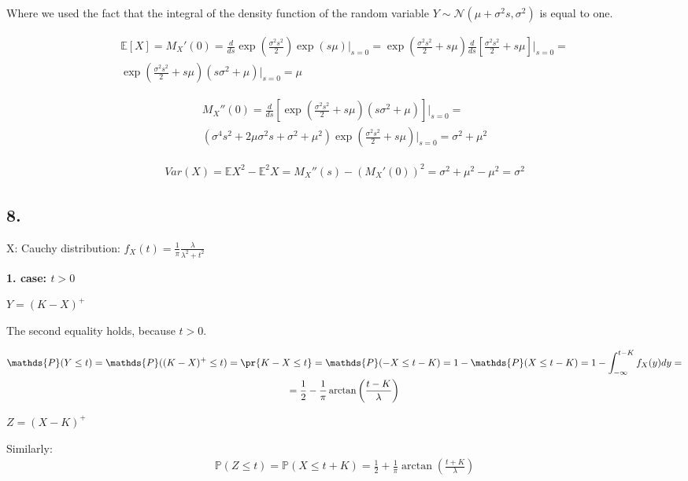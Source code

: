  Where we used the fact that the integral of the density function of the random variable $Y \sim\mathcal{N}(\mu+\sigma^2s, \sigma^2)$ is equal to one.
 
 \begin{gather*}
     \mathbb{E}[X]=M_X'(0)=\frac{d}{ds} \exp{(\frac{\sigma^2s^2}{2})}\exp{(s\mu)} \bigg\rvert_{s=0}=
     \exp\left(\frac{\sigma^2 s^2}{2}+s\mu\right)\frac{d}{ds}\left[\frac{\sigma^2 s^2}{2}+s\mu\right]\bigg\rvert_{s=0}= \\ \exp\left(\frac{\sigma^2 s^2}{2}+s\mu\right) \left(s\sigma^2+\mu\right)\bigg\rvert_{s=0} = \mu
 \end{gather*}
 
 \begin{gather*}
     M_X''(0)= \frac{d}{ds} \left[\exp\left(\frac{\sigma^2 s^2}{2}+s\mu\right) \left(s\sigma^2+\mu\right) \right]\bigg\rvert_{s=0} = \\ (\sigma^4s^2+2\mu\sigma^2s+\sigma^2+\mu^2)\exp\left(\frac{\sigma^2 s^2}{2}+s\mu\right) \bigg\rvert_{s=0} = \sigma^2 + \mu^2
 \end{gather*}
 
 \begin{gather*}
     Var(X)=\mathbb{E}X^2-\mathbb{E}^2X=M_X''(s)-(M_X'(0))^2=\sigma^2+\mu^2-\mu^2=\sigma^2
 \end{gather*}
 
 \subsection*{8.}
 X: Cauchy distribution: $f_X(t)=\frac{1}{\pi}\frac{\lambda}{\lambda^2+t^2}$
 
 \textbf{1. case: $t>0$}
 
 $Y=(K-X)^+$
 
 The second equality holds, because $t>0$.

 \begin{gather*}
     \mathds{P}(Y\le t)=\mathds{P}((K-X)^+\le t)=\pr{K-X\le t}=\mathds{P}(-X\le t-K)= 1- \mathds{P}(X\le t-K
     ) = 1- \int_{-\infty}^{t-K} f_X(y) dy =\\ 
     =\frac{1}{2} - \frac{1}{\pi} \arctan\left(\frac{t-K}{\lambda}\right) 
 \end{gather*}
 
 $Z=(X-K)^+$
 
 Similarly: 
 \begin{gather*}
     \mathds{P}(Z\le t)=\mathds{P}(X \le t+K) =\frac{1}{2} + \frac{1}{\pi} \arctan\left(\frac{t+K}{\lambda}\right) 
 \end{gather*}
 
